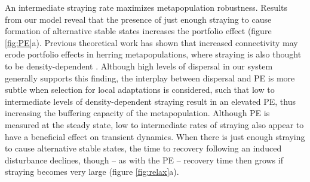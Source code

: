 \documentclass{revtex4}
\begin{document}
% 

An intermediate straying rate maximizes metapopulation robustness. 
Results from our model reveal that the presence of just enough straying to cause formation of alternative stable states increases the portfolio effect (figure \ref{fig:PE}a). 
Previous theoretical work has shown that increased connectivity may erode portfolio effects in herring metapopulations, where straying is also thought to be density-dependent \citep{Secor:2009ena}.
Although high levels of dispersal in our system generally supports this finding, the interplay between dispersal and PE is more subtle when selection for local adaptations is considered, such that low to intermediate levels of density-dependent straying result in an elevated PE, thus increasing the buffering capacity of the metapopulation.
Although PE is measured at the steady state, low to intermediate rates of straying also appear to have a beneficial effect on transient dynamics.
When there is just enough straying to cause alternative stable states, the time to recovery following an induced disturbance declines, though -- as with the PE -- recovery time then grows if straying becomes very large (figure \ref{fig:relax}a).

\end{document}
